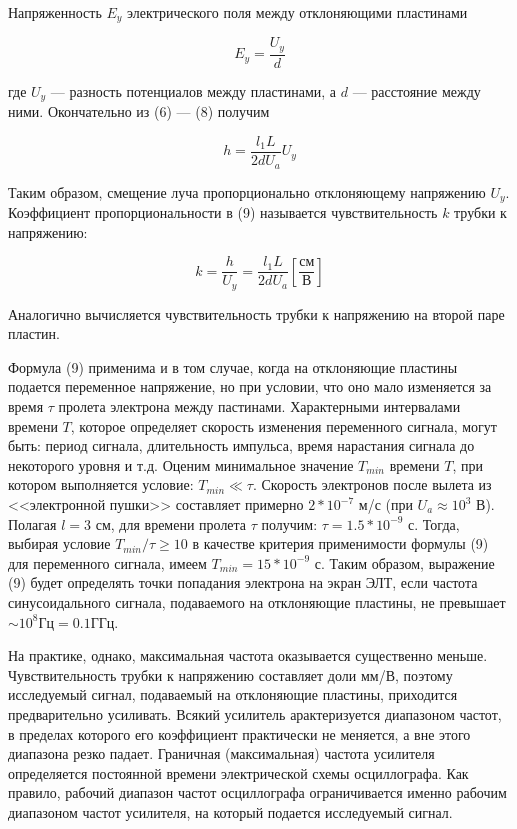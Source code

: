 \documentclass[14pt]{article}
\begin{document}
Напряженность $E_y$ электрического поля между отклоняющими пластинами 

\begin{equation}
E_y = \frac{U_y}{d}
\end{equation}

\noindent где $U_y$ --- разность потенциалов между пластинами, а $d$ --- расстояние между ними. Окончательно из (6) --- (8) получим

\begin{equation}
h = \frac{l_1L}{2dU_a}U_y
\end{equation}

\noindent Таким образом, смещение луча пропорционально отклоняющему напряжению $U_y$. Коэффициент пропорциональности в (9) называется чувствительность $k$ трубки к напряжению:

\begin{equation}
k = \frac{h}{U_y} = \frac{l_1L}{2dU_a}\left[\frac{\text{см}}{\text{В}}\right]
\end{equation}

\noindent Аналогично вычисляется чувствительность трубки к напряжению на второй паре пластин. 

Формула (9) применима и в том случае, когда на отклоняющие пластины подается переменное напряжение, но при условии, что оно мало изменяется за время $\tau$ пролета электрона между пастинами. Характерными интервалами времени $T$, которое определяет скорость изменения переменного сигнала, могут быть: период сигнала, длительность импульса, время нарастания сигнала до некоторого уровня и т.д. Оценим минимальное значение $T_{min}$ времени $T$, при котором выполняется условие: $T_{min} \ll \tau$. Скорость электронов после вылета из <<электронной пушки>> составляет примерно $2*10^{-7}$ м/с (при $U_a \approx 10^3$ В). Полагая $l = 3$ см, для времени пролета $\tau$ получим: $\tau = 1.5*10^{-9}$ с. Тогда, выбирая условие $T_{min}/\tau \ge 10$ в качестве критерия применимости формулы (9) для переменного сигнала, имеем $T_{min} = 15*10^{-9}$ с. Таким образом, выражение (9) будет определять точки попадания электрона на экран ЭЛТ, если частота синусоидального сигнала, подаваемого на отклоняющие пластины, не превышает $\sim 10^8 \text{Гц} = 0.1 \text{ГГц}$. 

На практике, однако, максимальная частота оказывается существенно меньше. Чувствительность трубки к напряжению составляет доли мм/В, поэтому исследуемый сигнал, подаваемый на отклоняющие пластины, приходится предварительно усиливать. Всякий усилитель арактеризуется диапазоном частот, в пределах которого его коэффициент практически не меняется, а вне этого диапазона резко падает. Граничная (максимальная) частота усилителя определяется постоянной времени электрической схемы осциллографа. Как правило, рабочий диапазон частот осциллографа ограничивается именно рабочим диапазоном частот усилителя, на который подается исследуемый сигнал. 
\end{document}
